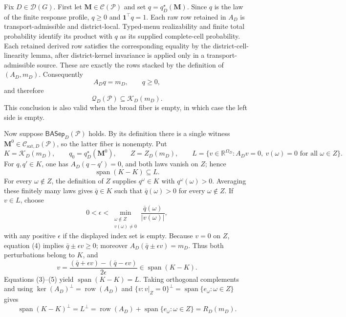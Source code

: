 Fix \(D\in\mathcal D(G)\). First let \(\mathbf M\in\mathcal C(\mathcal P)\) and set \(q=q_D^\star(\mathbf M)\). Since \(q\) is the law of the finite response profile, \(q\geq0\) and \(\mathbf 1^\top q=1\). Each raw row retained in \(A_D\) is transport-admissible and district-local. Typed-menu realizability and finite total probability identify its product with \(q\) as its supplied complete-cell probability. Each retained derived row satisfies the corresponding equality by the district-cell-linearity lemma, after district-kernel invariance is applied only in a transport-admissible source. These are exactly the rows stacked by the definition of \((A_D,m_D)\). Consequently
\[
A_Dq=m_D,\qquad q\geq0,\tag{1}
\]
and therefore
\[
\mathcal Q_D(\mathcal P)\subseteq\mathcal K_D(m_D).\tag{2}
\]
This conclusion is also valid when the broad fiber is empty, in which case the left side is empty.

Now suppose \(\mathsf{BASep}_D(\mathcal P)\) holds. By its definition there is a single witness
\(\mathbf M^0\in\mathcal C_{\mathrm{sat},D}(\mathcal P)\), so the latter fiber is nonempty. Put
\[
K=\mathcal K_D(m_D),\qquad q_0=q_D^\star(\mathbf M^0),\qquad
Z=Z_D(m_D),\qquad
L=\{v\in\mathbb R^{\Omega_D}:A_Dv=0,\ v(\omega)=0\text{ for all }\omega\in Z\}.
\]
For \(q,q'\in K\), one has \(A_D(q-q')=0\), and both laws vanish on \(Z\); hence
\[
\operatorname{span}(K-K)\subseteq L.\tag{3}
\]
For every \(\omega\notin Z\), the definition of \(Z\) supplies \(q^\omega\in K\) with \(q^\omega(\omega)>0\). Averaging these finitely many laws gives \(\bar q\in K\) such that
\(\bar q(\omega)>0\) for every \(\omega\notin Z\). If \(v\in L\), choose
\[
0<\epsilon<\min_{\substack{\omega\notin Z\\v(\omega)\ne0}}
\frac{\bar q(\omega)}{|v(\omega)|},\tag{4}
\]
with any positive \(\epsilon\) if the displayed index set is empty. Because \(v=0\) on \(Z\), equation (4) implies \(\bar q\pm\epsilon v\geq0\); moreover \(A_D(\bar q\pm\epsilon v)=m_D\). Thus both perturbations belong to \(K\), and
\[
v=\frac{(\bar q+\epsilon v)-(\bar q-\epsilon v)}{2\epsilon}\in\operatorname{span}(K-K).\tag{5}
\]
Equations (3)--(5) yield \(\operatorname{span}(K-K)=L\). Taking orthogonal complements and using
\(\ker(A_D)^\perp=\operatorname{row}(A_D)\) and
\(\{v:v|_Z=0\}^\perp=\operatorname{span}\{e_\omega:\omega\in Z\}\) gives
\[
\operatorname{span}(K-K)^\perp
=L^\perp
=\operatorname{row}(A_D)+\operatorname{span}\{e_\omega:\omega\in Z\}
=R_D(m_D).\tag{6}
\]

